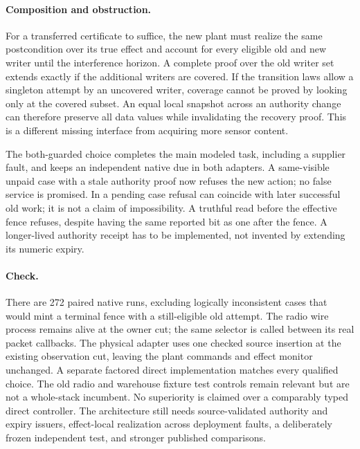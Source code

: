 \documentclass{article}
\begin{document}
\paragraph{Composition and obstruction.}
For a transferred certificate to suffice, the new plant must realize
the same postcondition over its true effect and account for every eligible
old and new writer until the interference horizon. A complete proof over
the old writer set extends exactly if the additional writers are covered.
If the transition laws allow a singleton attempt by an uncovered writer,
coverage cannot be proved by looking only at the covered subset.
An equal local snapshot across an authority change can therefore preserve
all data values while invalidating the recovery proof. This is a different
missing interface from acquiring more sensor content.

The both-guarded choice completes the main modeled task, including
a supplier fault, and keeps an independent native due in both adapters.
A same-visible unpaid case with a stale authority proof now refuses the
new action; no false service is promised. In a pending case refusal can
coincide with later successful old work; it is not a claim of impossibility.
A truthful read before the effective fence refuses, despite having the
same reported bit as one after the fence. A longer-lived authority receipt
has to be implemented, not invented by extending its numeric expiry.

\paragraph{Check.}
There are 272 paired native runs, excluding logically inconsistent cases
that would mint a terminal fence with a still-eligible old attempt.
The radio wire process remains alive at the owner cut; the same selector is
called between its real packet callbacks. The physical adapter uses one
checked source insertion at the existing observation cut, leaving the
plant commands and effect monitor unchanged. A separate factored direct
implementation matches every qualified choice. The old radio and warehouse
fixture test controls remain relevant but are not a whole-stack incumbent.
No superiority is claimed over a comparably typed direct controller.
The architecture still needs source-validated authority and expiry
issuers, effect-local realization across deployment faults, a deliberately
frozen independent test, and stronger published comparisons.
\end{document}

